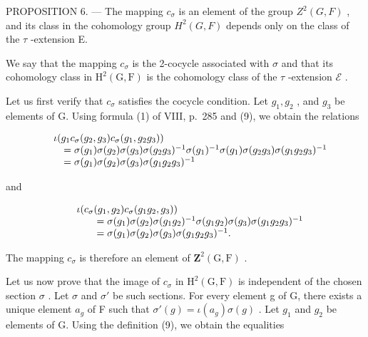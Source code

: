 PROPOSITION 6. --- The mapping \(c_{\sigma}\) is an element of the group \(Z^{2}(G,F)\) , and its class in the cohomology group \(H^{2}(G,F)\) depends only on the class of the \(\tau\) -extension E.

We say that the mapping \(c_{\sigma}\) is the 2-cocycle associated with \(\sigma\) and that its cohomology class in \(\mathrm{H}^2 (\mathrm{G},\mathrm{F})\) is the cohomology class of the \(\tau\) -extension \(\mathcal{E}\) .

Let us first verify that \(c_{\sigma}\) satisfies the cocycle condition. Let \(g_{1}, g_{2}\) , and \(g_{3}\) be elements of G. Using formula (1) of VIII, p.~285 and (9), we obtain the relations

\[
\begin{array}{r l} & {\iota (g _ {1} c _ {\sigma} (g _ {2}, g _ {3}) c _ {\sigma} (g _ {1}, g _ {2} g _ {3}))} \\ & {\quad = \sigma (g _ {1}) \sigma (g _ {2}) \sigma (g _ {3}) \sigma (g _ {2} g _ {3}) ^ {- 1} \sigma (g _ {1}) ^ {- 1} \sigma (g _ {1}) \sigma (g _ {2} g _ {3}) \sigma (g _ {1} g _ {2} g _ {3}) ^ {- 1}} \\ & {\quad = \sigma (g _ {1}) \sigma (g _ {2}) \sigma (g _ {3}) \sigma (g _ {1} g _ {2} g _ {3}) ^ {- 1}} \end{array}
\]

and

\[
\begin{array}{r l} & {\iota (c _ {\sigma} (g _ {1}, g _ {2}) c _ {\sigma} (g _ {1} g _ {2}, g _ {3}))} \\ & {\qquad = \sigma (g _ {1}) \sigma (g _ {2}) \sigma (g _ {1} g _ {2}) ^ {- 1} \sigma (g _ {1} g _ {2}) \sigma (g _ {3}) \sigma (g _ {1} g _ {2} g _ {3}) ^ {- 1}} \\ & {\qquad = \sigma (g _ {1}) \sigma (g _ {2}) \sigma (g _ {3}) \sigma (g _ {1} g _ {2} g _ {3}) ^ {- 1}.} \end{array}
\]

The mapping \(c_{\sigma}\) is therefore an element of \(\mathbf{Z}^2 (\mathrm{G},\mathrm{F})\) .

Let us now prove that the image of \(c_{\sigma}\) in \(\mathrm{H}^{2}(\mathrm{G},\mathrm{F})\) is independent of the chosen section \(\sigma\) . Let \(\sigma\) and \(\sigma'\) be such sections. For every element g of G, there exists a unique element \(a_{g}\) of F such that \(\sigma'(g) = \iota(a_{g})\sigma(g)\) . Let \(g_{1}\) and \(g_{2}\) be elements of G. Using the definition (9), we obtain the equalities

